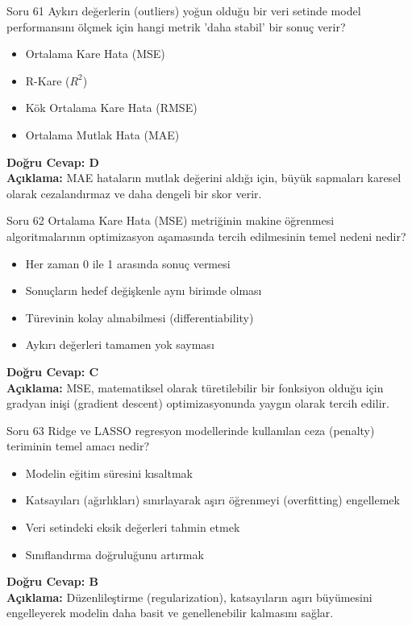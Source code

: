 \documentclass[12pt,a4paper]{article}
\begin{document}
\begin{testcard}{Soru 61}
    Aykırı değerlerin (outliers) yoğun olduğu bir veri setinde model performansını ölçmek için hangi metrik 'daha stabil' bir sonuç verir?
    \begin{itemize}
        \item[A)] Ortalama Kare Hata (MSE)
        \item[B)] R-Kare ($R^2$)
        \item[C)] Kök Ortalama Kare Hata (RMSE)
        \item[D)] Ortalama Mutlak Hata (MAE)
    \end{itemize}
    \tcblower
    \textbf{Doğru Cevap: D} \\
    \textbf{Açıklama:} MAE hataların mutlak değerini aldığı için, büyük sapmaları karesel olarak cezalandırmaz ve daha dengeli bir skor verir.
\end{testcard}

\begin{testcard}{Soru 62}
    Ortalama Kare Hata (MSE) metriğinin makine öğrenmesi algoritmalarının optimizasyon aşamasında tercih edilmesinin temel nedeni nedir?
    \begin{itemize}
        \item[A)] Her zaman 0 ile 1 arasında sonuç vermesi
        \item[B)] Sonuçların hedef değişkenle aynı birimde olması
        \item[C)] Türevinin kolay alınabilmesi (differentiability)
        \item[D)] Aykırı değerleri tamamen yok sayması
    \end{itemize}
    \tcblower
    \textbf{Doğru Cevap: C} \\
    \textbf{Açıklama:} MSE, matematiksel olarak türetilebilir bir fonksiyon olduğu için gradyan inişi (gradient descent) optimizasyonunda yaygın olarak tercih edilir.
\end{testcard}

\begin{testcard}{Soru 63}
    Ridge ve LASSO regresyon modellerinde kullanılan ceza (penalty) teriminin temel amacı nedir?
    \begin{itemize}
        \item[A)] Modelin eğitim süresini kısaltmak
        \item[B)] Katsayıları (ağırlıkları) sınırlayarak aşırı öğrenmeyi (overfitting) engellemek
        \item[C)] Veri setindeki eksik değerleri tahmin etmek
        \item[D)] Sınıflandırma doğruluğunu artırmak
    \end{itemize}
    \tcblower
    \textbf{Doğru Cevap: B} \\
    \textbf{Açıklama:} Düzenlileştirme (regularization), katsayıların aşırı büyümesini engelleyerek modelin daha basit ve genellenebilir kalmasını sağlar.
\end{testcard}
\end{document}
